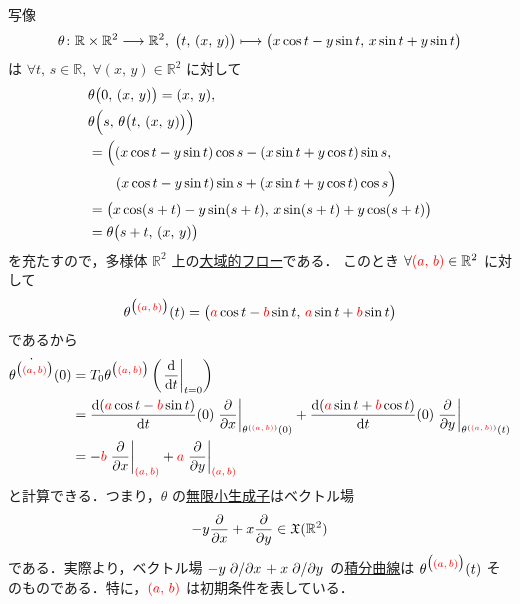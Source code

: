 \documentclass[TQFT_main]{subfiles}
\begin{document}
\begin{myexample}[]{}
    \cinfty 写像
    \begin{align}
        \theta \colon \mathbb{R} \times \mathbb{R}^2 \longrightarrow \mathbb{R}^2,\; \bigl( t,\, (x,\, y) \bigr) \longmapsto \bigl( x \cos t - y \sin t,\, x \sin t + y \sin t \bigr) 
    \end{align}
    は $\forall t,\, s \in \mathbb{R},\; \forall (x,\, y) \in \mathbb{R}^2$ に対して 
    \begin{align}
        &\theta \bigl( 0,\, (x,\, y) \bigr) = (x,\, y), \\ 
        &\theta \Bigl( s,\, \theta \bigl( t,\, (x,\, y) \bigr)  \Bigr) \\
        &= \Bigl( (x \cos t - y \sin t) \cos s - (x \sin t + y \cos t) \sin s,\\
        &\qquad (x \cos t - y\sin t) \sin s + (x \sin t + y \cos t) \cos s \Bigr) \\
        &= \bigl( x \cos (s + t) - y \sin (s + t),\, x \sin (s + t) +  y \cos (s + t) \bigr) \\
        &= \theta \bigl( s + t,\, (x,\, y) \bigr)
    \end{align}
    を充たすので，多様体 $\mathbb{R}^2$ 上の\hyperref[def:global-flow]{大域的フロー}である．
    このとき $\forall \textcolor{red}{(a,\, b)} \in \mathbb{R}^2$ に対して
    \begin{align}
        \theta^{\bigl(\textcolor{red}{(a,\, b)}\bigr)} (t) = \bigl( \textcolor{red}{a} \cos t - \textcolor{red}{b} \sin t,\, \textcolor{red}{a} \sin t + \textcolor{red}{b} \sin t \bigr) 
    \end{align}
    であるから
    \begin{align}
        \dot{\theta^{\bigl(\textcolor{red}{(a,\, b)}\bigr)}} (0) 
        &= T_0 \theta^{\bigl(\textcolor{red}{(a,\, b)}\bigr)}  \left( \eval{\dv{}{t}}_{t=0} \right) \\
        &= \dv{(\textcolor{red}{a} \cos t - \textcolor{red}{b} \sin t)}{t}()(0) \eval{\pdv{}{x}}_{\theta^{(\textcolor{red}{(a,\, b)})} (0)} + \dv{(\textcolor{red}{a} \sin t + \textcolor{red}{b} \cos t)}{t}()(0) \eval{\pdv{}{y}}_{\theta^{(\textcolor{red}{(a,\, b)})} (t)} \\
        &= - \textcolor{red}{b} \eval{\pdv{}{x}}_{\textcolor{red}{(a,\, b)}} + \textcolor{red}{a} \eval{\pdv{}{y}}_{\textcolor{red}{(a,\, b)}}
    \end{align}
    と計算できる．つまり，$\theta$ の\hyperref[prop:infinitesimal-generator]{無限小生成子}はベクトル場
    \begin{align}
        -y \pdv{}{x} + x \pdv{}{y} \in \mathfrak{X}(\mathbb{R}^2)
    \end{align}
    である．実際より，ベクトル場 $-y \pdv*{}{x} + x \pdv*{}{y}$ の\hyperref[def:integral-curve]{積分曲線}は $\theta^{\bigl(\textcolor{red}{(a,\, b)}\bigr)} (t)$ そのものである．特に，$\textcolor{red}{(a,\, b)}$ は初期条件を表している．
\end{myexample}
\end{document}
